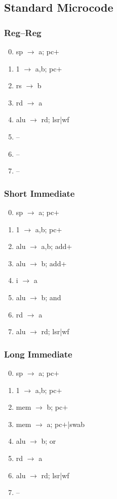 \documentclass[11pt]{book}
\begin{document}
\subsection*{Standard Microcode}
\begin{multicols}{3}\ttfamily\selectfont\small
  \subsubsection*{Reg--Reg}
  \begin{enumerate}\setcounter{enumi}{-1}
  \item sp \(\rightarrow\) a; pc\(+\)
  \item 1 \(\rightarrow\) a,b; pc\(+\)
  \item rs \(\rightarrow\) b
  \item rd \(\rightarrow\) a
  \item alu \(\rightarrow\) rd; lsr|wf
  \item --
  \item --
  \item --
  \end{enumerate}
  \columnbreak
  \subsubsection*{Short Immediate}
  \begin{enumerate}\setcounter{enumi}{-1}
  \item sp \(\rightarrow\) a; pc\(+\)
  \item 1 \(\rightarrow\) a,b; pc\(+\)
  \item alu \(\rightarrow\) a,b; add+
  \item alu \(\rightarrow\) b; add+
  \item i \(\rightarrow\) a
  \item alu \(\rightarrow\) b; and
  \item rd \(\rightarrow\) a
  \item alu \(\rightarrow\) rd; lsr|wf
  \end{enumerate}
  \columnbreak
  \subsubsection*{Long Immediate}
  \begin{enumerate}\setcounter{enumi}{-1}
  \item sp \(\rightarrow\) a; pc\(+\)
  \item 1 \(\rightarrow\) a,b; pc\(+\)
  \item mem \(\rightarrow\) b; pc\(+\)
  \item mem \(\rightarrow\) a; pc\(+\)|swab
  \item alu \(\rightarrow\) b; or
  \item rd \(\rightarrow\) a
  \item alu \(\rightarrow\) rd; lsr|wf
  \item --
  \end{enumerate}
\end{multicols}
\end{document}
